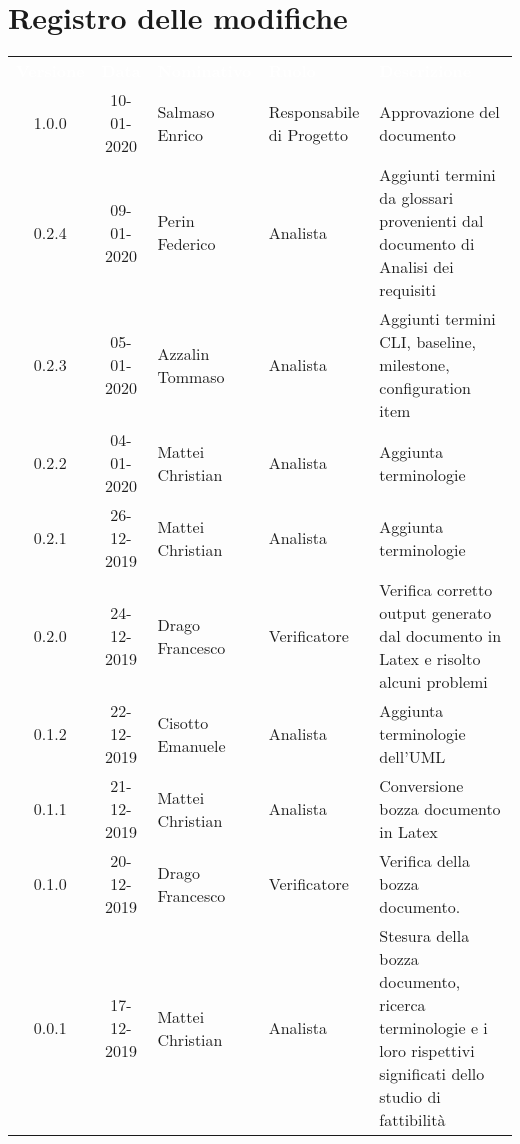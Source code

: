 \section*{Registro delle modifiche}
{
\renewcommand{\arraystretch}{1.5}
\centering
\begin{longtable}{ c c  C{4cm}  C{3cm} C{4cm}}
\textcolor{white}{\textbf{Versione}} & \textcolor{white}{\textbf{Data}} & \textcolor{white}{\textbf{Nominativo}} & \textcolor{white}{\textbf{Ruolo}} & \textcolor{white}{\textbf{Descrizione}}\\	


1.0.0 & 10-01-2020 & Salmaso Enrico & Responsabile di Progetto & Approvazione del documento \\

0.2.4 & 09-01-2020 & Perin Federico & Analista & Aggiunti termini da glossari provenienti dal documento di Analisi dei requisiti \\

0.2.3 & 05-01-2020 & Azzalin Tommaso & Analista & Aggiunti termini CLI, baseline, milestone, configuration item \\

0.2.2 & 04-01-2020 & Mattei Christian & Analista & Aggiunta terminologie \\

0.2.1 & 26-12-2019 & Mattei Christian & Analista & Aggiunta terminologie \\

0.2.0 & 24-12-2019 & Drago Francesco & Verificatore & Verifica corretto output generato dal documento in Latex e risolto alcuni problemi\\

0.1.2 & 22-12-2019 & Cisotto Emanuele & Analista & Aggiunta terminologie dell'UML \\

0.1.1 & 21-12-2019 & Mattei Christian & Analista & Conversione bozza documento in Latex\\
		
0.1.0 & 20-12-2019 & Drago Francesco & Verificatore & Verifica della bozza documento.  \\
		
0.0.1 & 17-12-2019 & Mattei Christian & Analista & Stesura della bozza documento, ricerca terminologie e i loro rispettivi significati dello studio di fattibilità \\
		
\end{longtable}
}